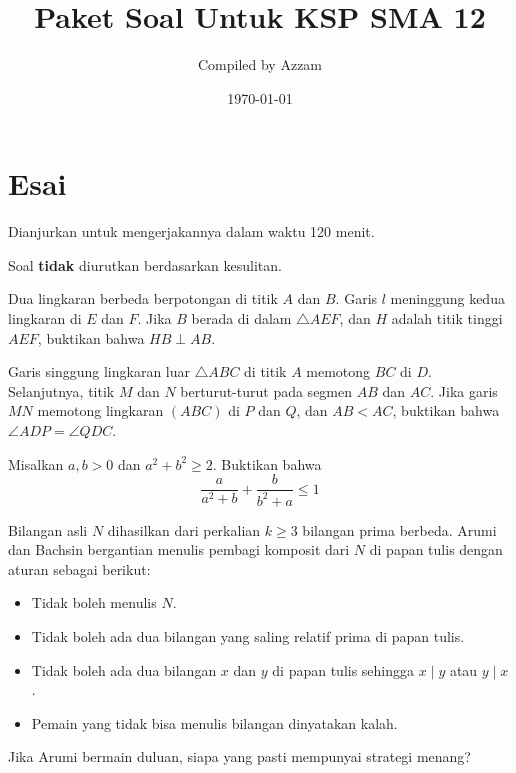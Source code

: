 \documentclass[11pt]{scrartcl}
\begin{document}
	\title{Paket Soal Untuk KSP SMA 12} %
	\date{\today}
	\author{Compiled by Azzam}
	\maketitle
	

	\section{Esai}
	Dianjurkan untuk mengerjakannya dalam waktu 120 menit.
	
	Soal \textbf{tidak} diurutkan berdasarkan kesulitan. 
	
	\begin{soalbaru}
	Dua lingkaran berbeda berpotongan di titik $A$ dan $B$. Garis $l$ meninggung kedua lingkaran di $E$ dan $F$. Jika $B$ berada di dalam $\triangle AEF$, dan $H$ adalah titik tinggi $AEF$, buktikan bahwa $HB \perp AB$.
	\end{soalbaru}
	
	\begin{soalbaru}
	Garis singgung lingkaran luar $\triangle ABC$ di titik $A$ memotong $BC$ di $D$. Selanjutnya, titik $M$ dan $N$ berturut-turut pada segmen $AB$ dan $AC$. Jika garis $MN$ memotong lingkaran $(ABC)$  di $P$ dan $Q$, dan $AB < AC$, buktikan bahwa $\angle ADP = \angle QDC$.
	\end{soalbaru}
	
	\begin{soalbaru}
	Misalkan $a,b>0$ dan $a^2+b^2\geq 2.$ Buktikan bahwa $$\frac{a}{a^2+b}+\frac{b}{b^2+a}\leq1$$
	\end{soalbaru}
	
	\begin{soalbaru}
	Bilangan asli $N$ dihasilkan dari perkalian $k \ge 3$ bilangan prima berbeda. Arumi dan Bachsin bergantian menulis pembagi komposit dari $N$ di papan tulis dengan aturan sebagai berikut:
	\begin{itemize}
	\item Tidak boleh menulis $N$.
	\item Tidak boleh ada dua bilangan yang saling relatif prima di papan tulis.
	\item Tidak boleh ada dua bilangan $x$ dan $y$ di papan tulis sehingga $x \mid y$ atau $y \mid x$.
	\item Pemain yang tidak bisa menulis bilangan dinyatakan kalah.
	\end{itemize}
	
	Jika Arumi bermain duluan, siapa yang pasti mempunyai strategi menang?
	\end{soalbaru}
	
\end{document}
